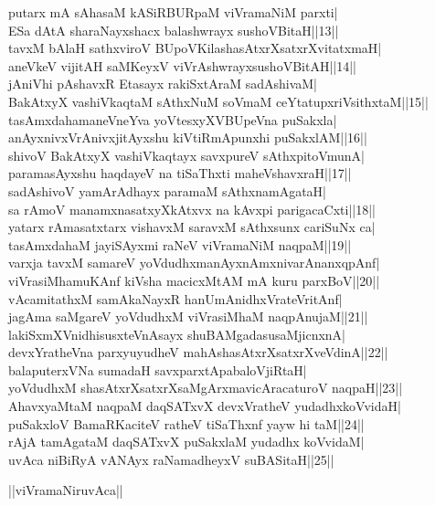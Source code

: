 \documentclass{article}
\begin{document}
putarx mA sAhasaM kASiRBURpaM viVramaNiM parxti|\\
ESa dAtA sharaNayxshacx balashwrayx sushoVBitaH||13||\\
tavxM bAlaH sathxviroV BUpoVKilashasAtxrXsatxrXvitatxmaH|\\
aneVkeV vijitAH saMKeyxV viVrAshwrayxsushoVBitAH||14||\\
jAniVhi pAshavxR Etasayx rakiSxtAraM sadAshivaM|\\
BakAtxyX vashiVkaqtaM sAthxNuM soVmaM ceYtatupxriVsithxtaM||15||\\
tasAmxdahamaneVneYva yoVtesxyXVBUpeVna puSakxla|\\
anAyxnivxVrAnivxjitAyxshu kiVtiRmApunxhi puSakxlAM||16||\\
shivoV BakAtxyX vashiVkaqtayx savxpureV sAthxpitoVmunA|\\
paramasAyxshu haqdayeV na tiSaThxti maheVshavxraH||17||\\
sadAshivoV yamArAdhayx paramaM sAthxnamAgataH|\\
sa rAmoV manamxnasatxyXkAtxvx na kAvxpi parigacaCxti||18||\\
yatarx rAmasatxtarx vishavxM saravxM sAthxsunx cariSuNx ca|\\
tasAmxdahaM jayiSAyxmi raNeV viVramaNiM naqpaM||19||\\
varxja tavxM samareV yoVdudhxmanAyxnAmxnivarAnanxqpAnf|\\
viVrasiMhamuKAnf kiVsha macicxMtAM mA kuru parxBoV||20||\\
vAcamitathxM samAkaNayxR hanUmAnidhxVrateVritAnf|\\
jagAma saMgareV yoVdudhxM viVrasiMhaM  naqpAnujaM||21||\\
lakiSxmXVnidhisusxteVnAsayx shuBAMgadasusaMjicnxnA|\\
devxYratheVna parxyuyudheV mahAshasAtxrXsatxrXveVdinA||22||\\
balaputerxVNa sumadaH savxparxtApabaloVjiRtaH|\\
yoVdudhxM shasAtxrXsatxrXsaMgArxmavicAracaturoV naqpaH||23||\\
AhavxyaMtaM naqpaM daqSATxvX devxVratheV yudadhxkoVvidaH|\\
puSakxloV BamaRKaciteV ratheV tiSaThxnf yayw hi taM||24||\\
rAjA tamAgataM daqSATxvX puSakxlaM yudadhx koVvidaM|\\
uvAca niBiRyA vANAyx raNamadheyxV suBASitaH||25||\\

\begin{center}
||viVramaNiruvAca||
\end{center}
\end{document}
